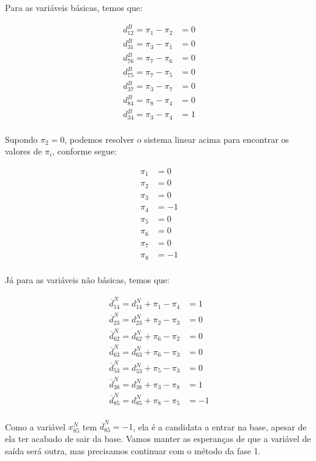 \documentclass{article}
\begin{document}
Para as variáveis básicas, temos que:

\begin{align*}
    d_{12}^{B} = \pi_{1} - \pi_{2} &= 0 \\
    d_{31}^{B} = \pi_{3} - \pi_{1} &= 0 \\
    d_{76}^{B} = \pi_{7} - \pi_{6} &= 0 \\
    d_{75}^{B} = \pi_{7} - \pi_{5} &= 0 \\
    d_{37}^{B} = \pi_{3} - \pi_{7} &= 0 \\
    d_{84}^{B} = \pi_{8} - \pi_{4} &= 0 \\
    d_{34}^{B} = \pi_{3} - \pi_{4} &= 1 \\
\end{align*}

Supondo $\pi_{2} = 0$, podemos resolver o sistema linear acima para encontrar os valores de $\pi_{i}$, conforme segue:

\begin{align*}
    \pi_{1} &= 0 \\
    \pi_{2} &= 0 \\
    \pi_{3} &= 0 \\
    \pi_{4} &= -1 \\
    \pi_{5} &= 0 \\
    \pi_{6} &= 0 \\
    \pi_{7} &= 0 \\
    \pi_{8} &= -1 \\
\end{align*}

Já para as variáveis não básicas, temos que:

\begin{align*}
    \overline{d}^{N}_{14} = d^{N}_{14} + \pi_{1} - \pi_{4} &= 1 \\
    \overline{d}^{N}_{23} = d^{N}_{23} + \pi_{2} - \pi_{3} &= 0 \\
    \overline{d}^{N}_{62} = d^{N}_{62} + \pi_{6} - \pi_{2} &= 0 \\
    \overline{d}^{N}_{63} = d^{N}_{63} + \pi_{6} - \pi_{3} &= 0 \\
    \overline{d}^{N}_{53} = d^{N}_{53} + \pi_{5} - \pi_{3} &= 0 \\
    \overline{d}^{N}_{38} = d^{N}_{38} + \pi_{3} - \pi_{8} &= 1 \\
    \overline{d}^{N}_{85} = d^{N}_{85} + \pi_{8} - \pi_{5} &= -1 \\
\end{align*}

Como a variável $x^{N}_{85}$ tem $\overline{d}^{N}_{85} = -1$, ela é a candidata a entrar na base, apesar de ela ter acabado de sair da base.
Vamos manter as esperanças de que a variável de saída será outra, mas precisamos continuar com o método da fase 1.
\end{document}
